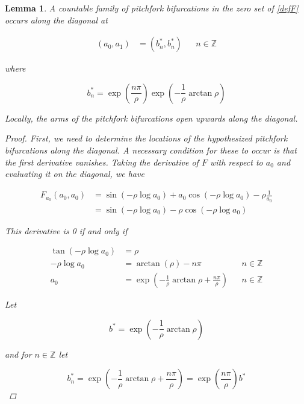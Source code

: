 \documentclass[12pt]{article}
\def\Z{{\mathbb Z}}
\newtheorem{lemma}{Lemma}
\begin{document}
\begin{lemma}\label{pitchfork}
A countable family of pitchfork bifurcations in the zero set of \eqref{defF} occurs along the diagonal at 

\begin{align*}
(a_0, a_1) &= (b_n^*, b_n^*) && n \in \Z
\end{align*}

where 

\begin{equation}
b^*_n = \exp\left(\frac{n \pi}{\rho} \right) \exp \left( -\frac{1}{\rho} \arctan \rho \right)
\end{equation}

Locally, the arms of the pitchfork bifurcations open upwards along the diagonal.

\begin{proof}
First, we need to determine the locations of the hypothesized pitchfork bifurcations along the diagonal. A necessary condition for these to occur is that the first derivative vanishes. Taking the derivative of $F$ with respect to $a_0$ and evaluating it on the diagonal, we have

\begin{align*}
F_{a_0}(a_0, a_0) &= 
\sin \left( - \rho \log a_0 \right)
+ a_0 \cos \left( - \rho \log a_0 \right)- \rho \frac{1}{a_0} \\
&= \sin \left( - \rho \log a_0 \right) - \rho \cos \left( - \rho \log a_0 \right)
\end{align*}

This derivative is 0 if and only if

\begin{align*}
\tan \left( -\rho \log a_0 \right) &=  \rho \\
-\rho \log a_0 &= \arctan \left( \rho\right) - n \pi && n \in \Z \\ 
a_0 &= \exp \left( -\frac{1}{\rho} \arctan \rho + \frac{n \pi}{\rho} \right) && n \in \Z
\end{align*}

Let 

\begin{equation}
b^* = \exp \left( -\frac{1}{\rho} \arctan \rho \right)
\end{equation}

and for $n \in \Z$ let 

\begin{equation}
b^*_n = \exp \left( -\frac{1}{\rho} \arctan \rho + \frac{n \pi}{\rho} \right) 
= \exp\left(\frac{n \pi}{\rho} \right) b^*
\end{equation}


\end{proof}
\end{lemma}
\end{document}
